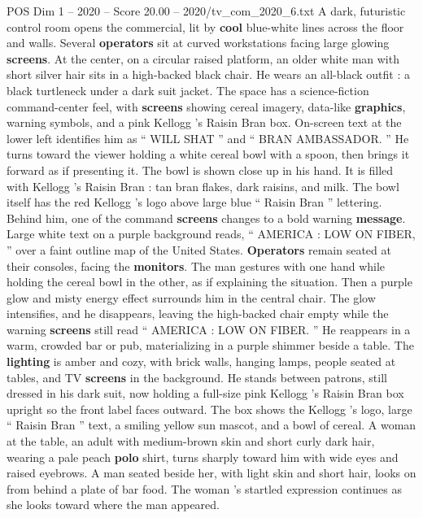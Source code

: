 \begin{textsample}{POS Dim 1 – 2020 – Score 20.00 – 2020/tv\_com\_2020\_6.txt}  \label{ex:f1_pos_005}
A dark, futuristic control room opens the commercial, lit by \textbf{cool} blue-white lines across the floor and walls.
Several \textbf{operators} sit at curved workstations facing large glowing \textbf{screens}.
At the center, on a circular raised platform, an older white man with short silver hair sits in a high-backed black chair.
He wears an all-black outfit : a black turtleneck under a dark suit jacket.
The space has a science-fiction command-center feel, with \textbf{screens} showing cereal imagery, data-like \textbf{graphics}, warning symbols, and a pink Kellogg ’s Raisin Bran box.
On-screen text at the lower left identifies him as “ WILL SHAT ” and “ BRAN AMBASSADOR. ” He turns toward the viewer holding a white cereal bowl with a spoon, then brings it forward as if presenting it.
The bowl is shown close up in his hand.
It is filled with Kellogg ’s Raisin Bran : tan bran flakes, dark raisins, and milk.
The bowl itself has the red Kellogg ’s logo above large blue “ Raisin Bran ” lettering.
Behind him, one of the command \textbf{screens} changes to a bold warning \textbf{message}.
Large white text on a purple background reads, “ AMERICA : LOW ON FIBER, ” over a faint outline map of the United States. \textbf{Operators} remain seated at their consoles, facing the \textbf{monitors}.
The man gestures with one hand while holding the cereal bowl in the other, as if explaining the situation.
Then a purple glow and misty energy effect surrounds him in the central chair.
The glow intensifies, and he disappears, leaving the high-backed chair empty while the warning \textbf{screens} still read “ AMERICA : LOW ON FIBER. ” He reappears in a warm, crowded bar or pub, materializing in a purple shimmer beside a table.
The \textbf{lighting} is amber and cozy, with brick walls, hanging lamps, people seated at tables, and TV \textbf{screens} in the background.
He stands between patrons, still dressed in his dark suit, now holding a full-size pink Kellogg ’s Raisin Bran box upright so the front label faces outward.
The box shows the Kellogg ’s logo, large “ Raisin Bran ” text, a smiling yellow sun mascot, and a bowl of cereal.
A woman at the table, an adult with medium-brown skin and short curly dark hair, wearing a pale peach \textbf{polo} shirt, turns sharply toward him with wide eyes and raised eyebrows.
A man seated beside her, with light skin and short hair, looks on from behind a plate of bar food.
The woman ’s startled expression continues as she looks toward where the man appeared.

\end{textsample}
